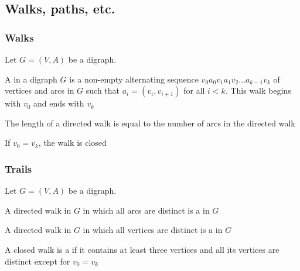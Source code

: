 \documentclass[aspectratio=169]{beamer}\usepackage[]{graphicx}\usepackage[]{xcolor}
\begin{document}
\subsection{Walks, paths, etc.}

\begin{frame}\frametitle{Walks}
	Let $G=(V,A)$ be a digraph.
	\begin{definition}
	A  in a digraph $G$ is a non-empty alternating sequence $v_0 a_0 v_1 a_1 v_2 \dots a_{k-1} v_k$ of vertices and arcs in $G$ such that $a_i=(v_i, v_{i+1})$ for all $i<k$. 
	This walk begins with $v_0$ and ends with $v_k$
	\end{definition}
	\begin{definition}
	The length of a directed walk is equal to the number of arcs in the directed walk
	\end{definition}
	\begin{definition}
	If $v_0=v_k$, the walk is closed
	\end{definition}
\end{frame}


\begin{frame}\frametitle{Trails}
	Let $G=(V,A)$ be a digraph.
	\begin{definition}
	A directed walk in $G$ in which all arcs are distinct is a  in $G$
	\end{definition}
	\begin{definition}
	A directed walk in $G$ in which all vertices are distinct is a  in $G$
	\end{definition}
	\begin{definition}
	A closed walk is a  if it contains at least three vertices and all its vertices are distinct except for $v_0=v_k$
	\end{definition}
\end{frame}
\end{document}
